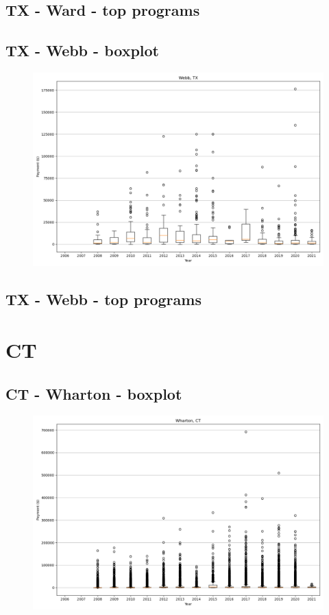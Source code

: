 \subsection*{TX - Ward - top programs}

\newpage
\subsection*{TX - Webb - boxplot}
\begin{figure}[h]
\centering
\includegraphics[width=7in]{../output/boxplots/counties/Webb-TX_boxplot.png}
\end{figure}


\subsection*{TX - Webb - top programs}

\newpage
\section*{CT}
\subsection*{CT - Wharton - boxplot}
\begin{figure}[h]
\centering
\includegraphics[width=7in]{../output/boxplots/counties/Wharton-CT_boxplot.png}
\end{figure}


